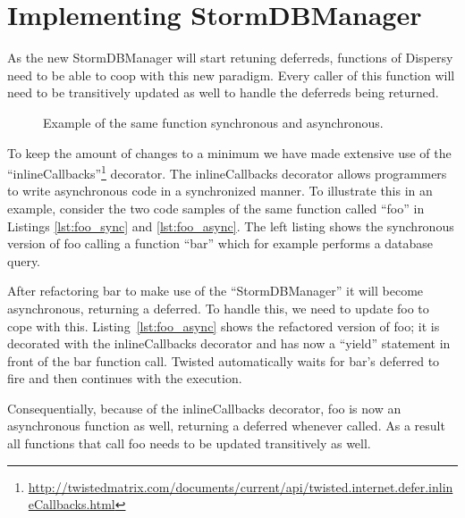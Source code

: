 \section{Implementing StormDBManager}
\label{sct:implementing_stormdbmanager}

As the new StormDBManager will start retuning deferreds, functions of Dispersy need to be able to coop with this new paradigm.
Every caller of this function will need to be transitively updated as well to handle the deferreds being returned.

\begin{figure}[h]
	\begin{subfigure}[b]{.5\linewidth}
		
	\end{subfigure}
	\begin{subfigure}[b]{.5\linewidth}
		
	\end{subfigure}
	\caption*{Example of the same function synchronous and asynchronous.}
\end{figure}

To keep the amount of changes to a minimum we have made extensive use of the \enquote{inlineCallbacks}\footnote{\url{http://twistedmatrix.com/documents/current/api/twisted.internet.defer.inlineCallbacks.html}} decorator.
The inlineCallbacks decorator allows programmers to write asynchronous code in a synchronized manner.
To illustrate this in an example, consider the two code samples of the same function called \enquote{foo} in Listings \ref{lst:foo_sync} and \ref{lst:foo_async}.
The left listing shows the synchronous version of foo calling a function \enquote{bar} which for example performs a database query.

After refactoring bar to make use of the \enquote{StormDBManager} it will become asynchronous, returning a deferred.
To handle this, we need to update foo to cope with this.
Listing~\ref{lst:foo_async} shows the refactored version of foo; it is decorated with the inlineCallbacks decorator and has now a \enquote{yield} statement in front of the bar function call.
Twisted automatically waits for bar's deferred to fire and then continues with the execution.

Consequentially, because of the inlineCallbacks decorator, foo is now an asynchronous function as well, returning a deferred whenever called.
As a result all functions that call foo needs to be updated transitively as well.


